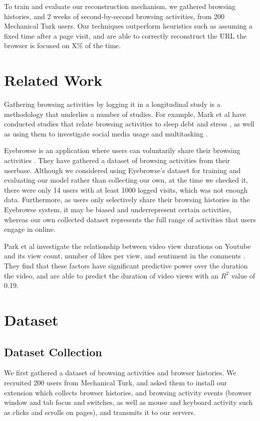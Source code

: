 \documentclass{sigchi}
\begin{document}
To train and evaluate our reconstruction mechanism, we gathered browsing histories, and 2 weeks of second-by-second browsing activities, from 200 Mechanical Turk users. Our techniques outperform heuristics such as assuming a fixed time after a page visit, and are able to correctly reconstruct the URL the browser is focused on X\% of the time.

\section{Related Work}

Gathering browsing activities by logging it in a longitudinal study is a methodology that underlies a number of studies. For example, Mark et al have conducted studies that relate browsing activities to sleep debt \cite{mark2016sleep} and stress \cite{mark2014stress}, as well as using them to investigate social media usage \cite{wang2015coming} and multitasking \cite{mark2015focused}.

Eyebrowse is an application where users can voluntarily share their browsing activities \cite{eyebrowse}. They have gathered a dataset of browsing activities from their userbase. Although we considered using Eyebrowse's dataset for training and evaluating our model rather than collecting our own, at the time we checked it, there were only 14 users with at least 1000 logged visits, which was not enough data. Furthermore, as users only selectively share their browsing histories in the Eyebrowse system, it may be biased and underrepresent certain activities, whereas our own collected dataset represents the full range of activities that users engage in online.

Park et al investigate the relationship between video view durations on Youtube and its view count, number of likes per view, and sentiment in the comments \cite{youtubeduration}. They find that these factors have significant predictive power over the duration the video, and are able to predict the duration of video views with an $R^2$ value of 0.19.

\section{Dataset}

\subsection{Dataset Collection}

We first gathered a dataset of browsing activities and browser histories. We recruited 200 users from Mechanical Turk, and asked them to install our extension which collects browser histories, and browsing activity events (browser window and tab focus and switches, as well as mouse and keyboard activity such as clicks and scrolls on pages), and transmits it to our servers.
\end{document}
